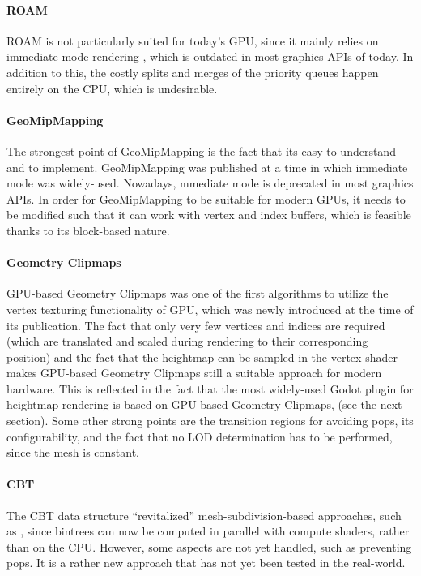 \paragraph{ROAM} ROAM is not particularly suited for today's GPU, since it mainly relies 
on immediate mode rendering \cite{geomclipmaps}, which is outdated in most graphics APIs of today.
In addition to this, the costly splits and merges of the priority queues happen entirely on the CPU,
which is undesirable.

\paragraph{GeoMipMapping} The strongest point of GeoMipMapping is the fact that its easy to understand and 
to implement.
GeoMipMapping was published at a time in which immediate mode was widely-used.
Nowadays, mmediate mode is deprecated in most graphics APIs.
In order for GeoMipMapping to be suitable for modern GPUs, it needs to be modified such that 
it can work with vertex and index buffers, which is feasible thanks to its block-based nature.

\paragraph{Geometry Clipmaps} GPU-based Geometry Clipmaps was one of the first algorithms to utilize 
the vertex texturing functionality of GPU, which was newly introduced at the time of its publication.
The fact that only very few vertices and indices are required (which are translated and scaled during rendering to their corresponding position) 
and the fact that the heightmap can be sampled in the vertex shader makes GPU-based Geometry Clipmaps still a suitable 
approach for modern hardware. This is reflected in the fact that the most widely-used Godot plugin for heightmap rendering 
is based on GPU-based Geometry Clipmaps, (see the next section).
Some other strong points are the transition regions for avoiding pops, its configurability, and the fact that 
no LOD determination has to be performed, since the mesh is constant.

\paragraph{CBT} The CBT data structure ``revitalized'' mesh-subdivision-based approaches, such as \cite{lindstrom1996,roam},
since bintrees can now be computed in parallel with compute shaders, rather than on the CPU. However, some aspects are not yet handled, such as 
preventing pops. It is a rather new approach that has not yet been tested in the real-world.

